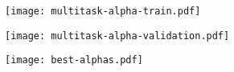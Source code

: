\begin{figure}[H]
  \texttt{[image: multitask-alpha-train.pdf]}
\end{figure}

\begin{figure}[H]
  \texttt{[image: multitask-alpha-validation.pdf]}
\end{figure}

\begin{figure}[H]
  \texttt{[image: best-alphas.pdf]}
\end{figure}
